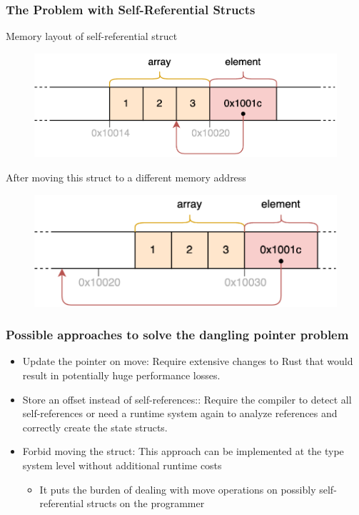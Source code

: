 \begin{frame}[fragile]
    \frametitle{The Problem with Self-Referential Structs}
% 
Memory layout of self-referential struct
% 
    \begin{figure}
    \includegraphics[width=0.53\linewidth]{figs/self-referential-struct.png}
    \end{figure} \pause
% 
% 
After moving this struct to a different memory address
% 
    \begin{figure}
    \includegraphics[width=0.53\linewidth]{figs/self-referential-struct-moved.png}
    \end{figure}
% 
\end{frame}
\begin{frame}[fragile]
    \frametitle{Possible approaches to solve the dangling pointer problem}
% 
% 
    \begin{itemize}
        \item {\color{red}Update the pointer on move:} Require extensive changes to Rust that would result in potentially huge  performance losses. \pause
        \item {\color{red}Store an offset instead of self-references:}: Require the compiler to {\color{red}detect all self-references} or need a runtime system again to analyze references and correctly create the  state structs. \pause
        \item {\color{red}Forbid moving the struct:} This approach can be implemented at the type system level without additional  runtime costs
    	\begin{itemize}
    	    \item It puts the burden of dealing with  move operations on possibly self-referential structs on the programmer
    	\end{itemize}
    \end{itemize}

\end{frame}
